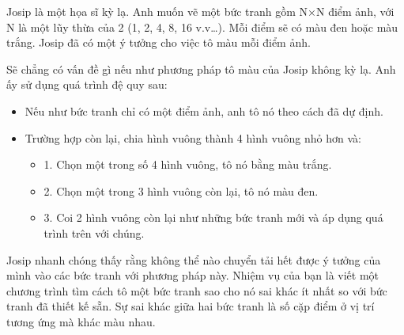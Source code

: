 Josip là một họa sĩ kỳ lạ. Anh muốn vẽ một bức tranh gồm N×N điểm ảnh, với N là một lũy thừa của 2 (1, 2, 4, 8, 16 v.v…). Mỗi điểm sẽ có màu đen hoặc màu trắng. Josip đã có một ý tưởng cho việc tô màu mỗi điểm ảnh.  

   Sẽ chẳng có vấn đề gì nếu như phương pháp tô màu của Josip không kỳ lạ. Anh ấy sử dụng quá trình đệ quy sau:  
\begin{itemize}
	\item     Nếu như bức tranh chỉ có một điểm ảnh, anh tô nó theo cách đã dự định.   
	\item     Trường hợp còn lại, chia hình vuông thành 4 hình vuông nhỏ hơn và:    
\begin{itemize}
	\item       1. Chọn một trong số 4 hình vuông, tô nó bằng màu trắng.     
	\item       2. Chọn một trong 3 hình vuông còn lại, tô nó màu đen.     
	\item       3. Coi 2 hình vuông còn lại như những bức tranh mới và áp dụng quá trình trên với chúng.     
\end{itemize}
\end{itemize}

   Josip nhanh chóng thấy rằng không thể nào chuyển tải hết được ý tưởng của mình vào các bức tranh với phương pháp này. Nhiệm vụ của bạn là viết một chương trình tìm cách tô một bức tranh sao cho nó sai khác ít nhất so với bức tranh đã thiết kế sẵn. Sự sai khác giữa hai bức tranh là số cặp điểm ở vị trí tương ứng mà khác màu nhau.